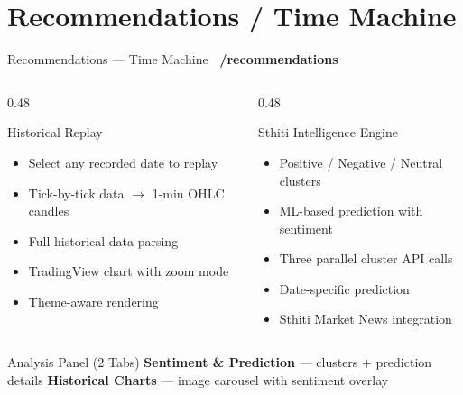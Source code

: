 \documentclass[aspectratio=169, 11pt]{beamer}
\newcommand{\tagbox}[2]{\colorbox{#1}{\scriptsize\color{white}\textbf{~#2~}}}
\begin{document}
\section{Recommendations / Time Machine}
\begin{frame}{Recommendations — Time Machine \hfill \tagbox{accentpurple}{/recommendations}}
\begin{columns}[T]
\begin{column}{0.48\textwidth}
\begin{block}{Historical Replay}
\begin{itemize}
  \item Select any recorded date to replay
  \item Tick-by-tick data $\rightarrow$ 1-min OHLC candles
  \item Full historical data parsing
  \item TradingView chart with zoom mode
  \item Theme-aware rendering
\end{itemize}
\end{block}
\end{column}
\begin{column}{0.48\textwidth}
\begin{block}{Sthiti Intelligence Engine}
\begin{itemize}
  \item Positive / Negative / Neutral clusters
  \item ML-based prediction with sentiment
  \item Three parallel cluster API calls
  \item Date-specific prediction
  \item Sthiti Market News integration
\end{itemize}
\end{block}
\end{column}
\end{columns}
\vfill
\begin{exampleblock}{Analysis Panel (2 Tabs)}
\textbf{Sentiment \& Prediction} — clusters + prediction details \hfill \textbf{Historical Charts} — image carousel with sentiment overlay
\end{exampleblock}
\end{frame}

\end{document}
